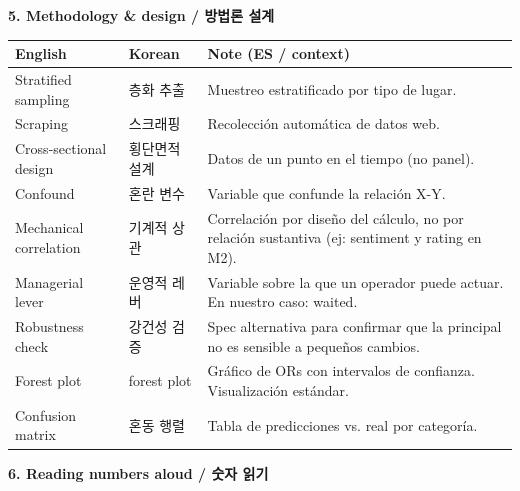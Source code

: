 \documentclass[10pt,a4paper]{article}
\begin{document}
\vspace{10pt}
\noindent\normalsize\textbf{\large 5. Methodology \& design / 방법론 설계}

\vspace{4pt}

\footnotesize

\begin{longtable}{@{}p{3.6cm} p{3.5cm} p{9cm}@{}}
\toprule
\textbf{English} & \textbf{Korean} & \textbf{Note (ES / context)} \\
\midrule
Stratified sampling          & 층화 추출                       & Muestreo estratificado por tipo de lugar. \\
Scraping                     & 스크래핑                         & Recolección automática de datos web. \\
Cross-sectional design       & 횡단면적 설계                     & Datos de un punto en el tiempo (no panel). \\
Confound                     & 혼란 변수                         & Variable que confunde la relación X-Y. \\
Mechanical correlation       & 기계적 상관                       & Correlación por diseño del cálculo, no por relación sustantiva (ej: sentiment y rating en M2). \\
Managerial lever              & 운영적 레버                      & Variable sobre la que un operador puede actuar. En nuestro caso: waited. \\
Robustness check              & 강건성 검증                      & Spec alternativa para confirmar que la principal no es sensible a pequeños cambios. \\
Forest plot                   & forest plot                     & Gráfico de ORs con intervalos de confianza. Visualización estándar. \\
Confusion matrix              & 혼동 행렬                        & Tabla de predicciones vs. real por categoría. \\
\bottomrule
\end{longtable}

\vspace{10pt}
\noindent\normalsize\textbf{\large 6. Reading numbers aloud / 숫자 읽기}

\vspace{4pt}

\footnotesize
\end{document}

